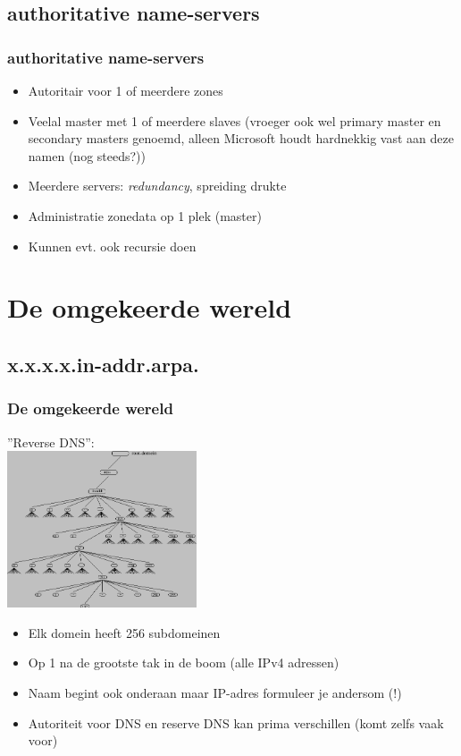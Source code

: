 \subsection{authoritative name-servers}
\begin{styleframe}
        \frametitle{authoritative name-servers}
\begin{itemize}
	\item Autoritair voor 1 of meerdere zones
	\item Veelal master met 1 of meerdere slaves
(vroeger ook wel primary master en secondary masters genoemd, alleen Microsoft houdt hardnekkig vast aan deze namen (nog steeds?))
	\item Meerdere servers: {\it redundancy}, spreiding drukte
	\item Administratie zonedata op 1 plek (master)
	\item Kunnen evt. ook recursie doen
\end{itemize}
\end{styleframe}

\section{De omgekeerde wereld}
\subsection{x.x.x.x.in-addr.arpa.}
\begin{styleframe}
        \frametitle{De omgekeerde wereld}
\begin{center}
''Reverse DNS'':\\
\includegraphics[width=5.6cm]{img/in-addr.png}\\
\end{center}
\pause
\begin{itemize}
	\item Elk domein heeft 256 subdomeinen
	\pause
	\item Op 1 na de grootste tak in de boom (alle IPv4 adressen)
	\pause
	\item Naam begint ook onderaan maar IP-adres formuleer je andersom (!)
	\pause
	\item Autoriteit voor DNS en reserve DNS kan prima verschillen (komt zelfs vaak voor)
\end{itemize}
\end{styleframe}

